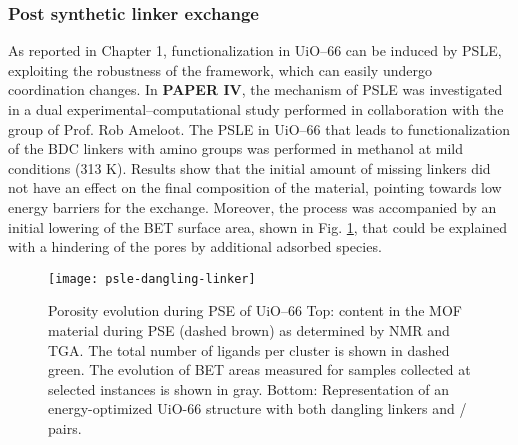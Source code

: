 \subsubsection*{Post synthetic linker exchange}
As reported in Chapter 1, functionalization in UiO--66 can be induced by PSLE, exploiting the robustness of the framework, which can easily undergo coordination changes. In \textbf{PAPER IV}, the mechanism of PSLE was investigated in a dual experimental--computational study performed in collaboration with the group of Prof. Rob Ameloot. The PSLE in UiO--66 that leads to functionalization of the BDC linkers with amino groups was performed in methanol at mild conditions (313 K). Results show that the initial amount of missing linkers did not have an effect on the final composition of the material, pointing towards low energy barriers for the exchange. Moreover, the process was accompanied by an initial lowering of the BET surface area, shown in Fig. \ref{fig:psle-dangling-linker}, that could be explained with a hindering of the pores by additional adsorbed species. 
\npar
\begin{figure}[!htbp]
	\centering
	\texttt{[image: psle-dangling-linker]}
	\caption{Porosity evolution during PSE of UiO--66 Top:  content in the MOF material during PSE (dashed brown) as determined by NMR and TGA. The total number of ligands per cluster is shown in dashed green. The evolution of BET areas measured for samples collected at selected instances is shown in gray. Bottom: Representation of an energy-optimized UiO-66 structure with both dangling linkers and / pairs. }
	\label{fig:psle-dangling-linker}
\end{figure}
